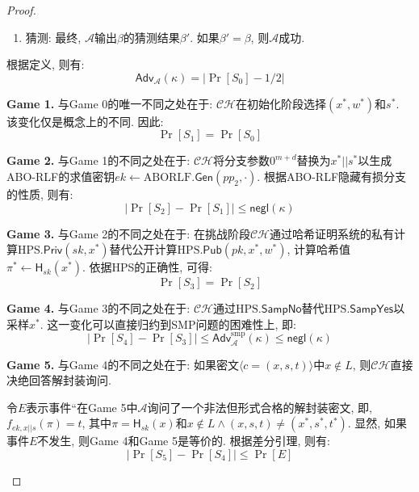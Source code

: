\begin{proof}
\begin{trivlist}
\begin{enumerate}
\item 猜测: 最终, $\mathcal{A}$输出$\beta$的猜测结果$\beta'$. 如果$\beta' = \beta$, 则$\mathcal{A}$成功.
\end{enumerate}
根据定义, 则有:
\begin{equation*}
    \mathsf{Adv}_\mathcal{A}(\kappa) = |\Pr[S_0] - 1/2| 
\end{equation*}

\item \textbf{Game 1.} 与Game 0的唯一不同之处在于: $\mathcal{CH}$在初始化阶段选择$(x^*, w^*)$和$s^*$. 该变化仅是概念上的不同. 因此: 
\begin{equation*}
    \Pr[S_1] = \Pr[S_0]
\end{equation*}

\item \textbf{Game 2.} 与Game 1的不同之处在于: $\mathcal{CH}$将分支参数$0^{m+d}$替换为$x^*||s^*$以生成ABO-RLF的求值密钥$ek \leftarrow \text{ABORLF}.\mathsf{Gen}(pp_2, \cdot)$. 根据ABO-RLF隐藏有损分支的性质, 则有:
\begin{equation*}
    |\Pr[S_2] - \Pr[S_1]| \leq \mathsf{negl}(\kappa)
\end{equation*}

\item \textbf{Game 3.} 与Game 2的不同之处在于: 在挑战阶段$\mathcal{CH}$通过哈希证明系统的私有计算$\text{HPS}.\mathsf{Priv}(sk, x^*)$替代公开计算$\text{HPS}.\mathsf{Pub}(pk, x^*, w^*)$, 计算哈希值$\pi^* \leftarrow \mathsf{H}_{sk}(x^*)$. 依据HPS的正确性, 可得: 
\begin{equation*}
    \Pr[S_3] = \Pr[S_2]
\end{equation*}

\item \textbf{Game 4.} 与Game 3的不同之处在于: $\mathcal{CH}$通过$\text{HPS}.\mathsf{SampNo}$替代$\text{HPS}.\mathsf{SampYes}$以采样$x^*$.  这一变化可以直接归约到SMP问题的困难性上, 即:
\begin{equation*}
    |\Pr[S_4] - \Pr[S_3]| \leq \mathsf{Adv}_\mathcal{A}^\text{smp}(\kappa) \leq \mathsf{negl}(\kappa)
\end{equation*}

\item \textbf{Game 5.} 与Game 4的不同之处在于: 如果密文$\langle c = (x, s, t) \rangle$中$x \notin L$, 则$\mathcal{CH}$直接决绝回答解封装询问.

令$E$表示事件``在Game 5中$\mathcal{A}$询问了一个非法但形式合格的解封装密文, 即, $f_{ek,x||s}(\pi) = t$, 其中$\pi = \mathsf{H}_{sk}(x)$和$x \notin L \wedge (x, s, t) \neq (x^*, s^*, t^*)$. 显然, 如果事件$E$不发生, 则Game 4和Game 5是等价的. 根据差分引理, 则有:
\begin{equation*}
    |\Pr[S_5] - \Pr[S_4]| \leq \Pr[E]
\end{equation*}


\end{trivlist}
\end{proof}
